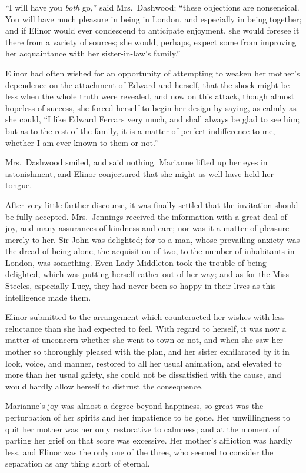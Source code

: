 ``I will have you \emph{both} go,'' said Mrs.\ Dashwood;
``these objections are nonsensical.  You will have much
pleasure in being in London, and especially in being together;
and if Elinor would ever condescend to anticipate enjoyment,
she would foresee it there from a variety of sources;
she would, perhaps, expect some from improving her
acquaintance with her sister-in-law's family.''

Elinor had often wished for an opportunity of
attempting to weaken her mother's dependence on the
attachment of Edward and herself, that the shock might
be less when the whole truth were revealed, and now
on this attack, though almost hopeless of success,
she forced herself to begin her design by saying,
as calmly as she could, ``I like Edward Ferrars very much,
and shall always be glad to see him; but as to the rest
of the family, it is a matter of perfect indifference
to me, whether I am ever known to them or not.''

Mrs.\ Dashwood smiled, and said nothing.
Marianne lifted up her eyes in astonishment, and Elinor
conjectured that she might as well have held her tongue.

After very little farther discourse, it was finally
settled that the invitation should be fully accepted.
Mrs.\ Jennings received the information with a great
deal of joy, and many assurances of kindness and care;
nor was it a matter of pleasure merely to her.  Sir John
was delighted; for to a man, whose prevailing anxiety
was the dread of being alone, the acquisition of two,
to the number of inhabitants in London, was something.
Even Lady Middleton took the trouble of being delighted,
which was putting herself rather out of her way;
and as for the Miss Steeles, especially Lucy, they had
never been so happy in their lives as this intelligence
made them.

Elinor submitted to the arrangement which counteracted
her wishes with less reluctance than she had expected
to feel.  With regard to herself, it was now a matter
of unconcern whether she went to town or not, and when
she saw her mother so thoroughly pleased with the plan,
and her sister exhilarated by it in look, voice, and manner,
restored to all her usual animation, and elevated to more
than her usual gaiety, she could not be dissatisfied
with the cause, and would hardly allow herself to distrust
the consequence.

Marianne's joy was almost a degree beyond happiness,
so great was the perturbation of her spirits and her
impatience to be gone.  Her unwillingness to quit her
mother was her only restorative to calmness; and at the
moment of parting her grief on that score was excessive.
Her mother's affliction was hardly less, and Elinor
was the only one of the three, who seemed to consider
the separation as any thing short of eternal.

